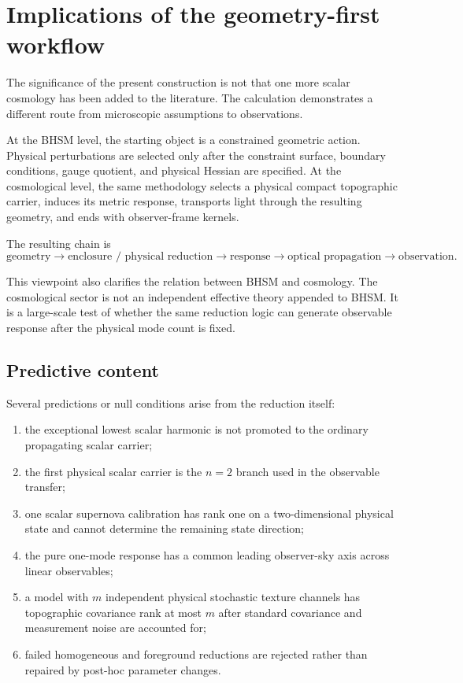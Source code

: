 \section{Implications of the geometry-first workflow}
\label{sec:geometry-first-implications}

The significance of the present construction is not that one more scalar
cosmology has been added to the literature.  The calculation demonstrates a
different route from microscopic assumptions to observations.

At the BHSM level, the starting object is a constrained geometric action.
Physical perturbations are selected only after the constraint surface,
boundary conditions, gauge quotient, and physical Hessian are specified.  At
the cosmological level, the same methodology selects a physical compact
topographic carrier, induces its metric response, transports light through
the resulting geometry, and ends with observer-frame kernels.

The resulting chain is
\begin{equation}
\boxed{
\text{geometry}
\rightarrow
\text{enclosure / physical reduction}
\rightarrow
\text{response}
\rightarrow
\text{optical propagation}
\rightarrow
\text{observation}.
}
\end{equation}

This viewpoint also clarifies the relation between BHSM and cosmology.  The
cosmological sector is not an independent effective theory appended to BHSM.
It is a large-scale test of whether the same reduction logic can generate
observable response after the physical mode count is fixed.

\subsection{Predictive content}

Several predictions or null conditions arise from the reduction itself:

\begin{enumerate}
\item the exceptional lowest scalar harmonic is not promoted to the ordinary
      propagating scalar carrier;
\item the first physical scalar carrier is the $n=2$ branch used in the
      observable transfer;
\item one scalar supernova calibration has rank one on a two-dimensional
      physical state and cannot determine the remaining state direction;
\item the pure one-mode response has a common leading observer-sky axis across
      linear observables;
\item a model with $m$ independent physical stochastic texture channels has
      topographic covariance rank at most $m$ after standard covariance and
      measurement noise are accounted for;
\item failed homogeneous and foreground reductions are rejected rather than
      repaired by post-hoc parameter changes.
\end{enumerate}

